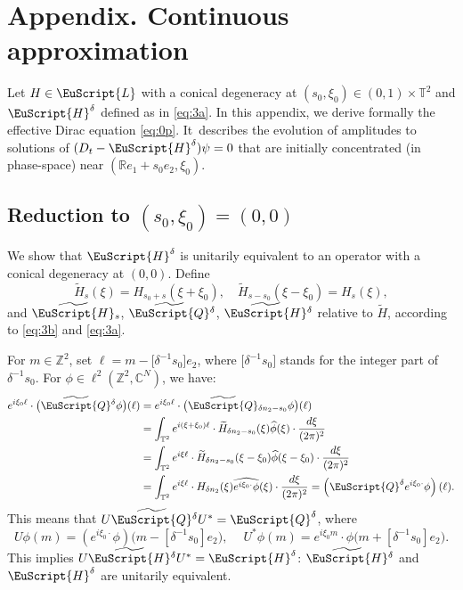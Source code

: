 \documentclass[JEP,XML,SOM,Unicode,NoFloatCountersInSection]{cedram}
\let\pazocal\EuScript
\theoremstyle{definition}
\newcommand{\QQ}{{\pazocal{Q}}}
\newcommand{\LL}{{\pazocal{L}}}
\newcommand{\HH}{\pazocal{H}}
\newcommand{\tHH}{\widetilde{\HH}{}}
\newcommand{\tQQ}{\widetilde{\QQ}{}}
\newcommand{\C}{\mathbb{C}}
\newcommand{\R}{\mathbb{R}}
\newcommand{\Z}{\mathbb{Z}}
\newcommand{\Tt}{{\mathbb{T}}}
\newcommand{\tH}{{\widetilde{H}}}
\newcommand{\hphi}{{\widehat{\phi}}}
\begin{document}
\appendix
{}
\section*{Appendix. Continuous approximation}
Let $H \in \LL$ with a conical degeneracy at $(s_0, \xi_0) \in (0,1) \times \Tt^2$ and $\HH^\delta$ defined as in \eqref{eq:3a}. In this appendix, we derive formally the effective Dirac equation \eqref{eq:0p}. It~describes the evolution of amplitudes to solutions of $(D_t-\HH^\delta) \psi = 0$ that are initially concentrated (in phase-space) near $(\R e_1+s_0e_2,\xi_0)$.

\subsection{Reduction to $(s_0, \xi_0) = (0,0)$}\label{sec:6.1} We show that $\HH^\delta$ is unitarily equivalent to an operator with a conical degeneracy at $(0,0)$. Define
\begin{equation}\label{eq:3f}
\tH_s(\xi) = H_{s_0+s}(\xi+\xi_0), \quad \tH_{s-s_0}(\xi-\xi_0) = H_s(\xi),
\end{equation}
and $\tHH_s$, $\tQQ^\delta$, $\tHH^\delta$ relative to $\tH$, according to \eqref{eq:3b} and \eqref{eq:3a}.

For $m \in \Z^2$, set $\ell = m - \bigl[\delta^{-1} s_0\bigr] e_2$, where $\bigl[\delta^{-1} s_0\bigr]$ stands for the integer part of $\delta^{-1} s_0$.
For $\phi \in \ell^2(\Z^2,\C^N)$, we have:
\[
\begin{split}
e^{i\xi_0 \ell } \cdot \bigl( \tQQ^\delta \phi \bigr)(\ell)
&= e^{i\xi_0 \ell } \cdot \bigl( \tQQ_{\delta n_2-s_0} \phi \bigr)(\ell)
\\
&= \int_{\Tt^2} e^{i(\xi+\xi_0) \ell} \cdot \tH_{\delta n_2-s_0}(\xi) \hphi(\xi) \cdot \dfrac{d\xi}{(2\pi)^2}\\
&= \int_{\Tt^2} e^{i\xi \ell} \cdot \tH_{\delta n_2-s_0}(\xi-\xi_0) \hphi(\xi-\xi_0) \cdot \dfrac{d\xi}{(2\pi)^2}
\\
&= \int_{\Tt^2} e^{i\xi \ell} \cdot H_{\delta n_2}(\xi) \widehat{e^{i\xi_0 \cdot}\phi}(\xi) \cdot \dfrac{d\xi}{(2\pi)^2} = \left(\QQ^\delta e^{i\xi_0 \cdot} \phi\right) (\ell).
\end{split}
\]
This means that $U \tQQ^\delta U^* = \QQ^\delta$, where
\begin{equation*}
U \phi(m) = \left(e^{i\xi_0 \cdot} \phi\right)\bigl( m - [\delta^{-1}s_0] e_2\bigr), \quad \ U^* \phi(m) = e^{i\xi_0 m} \cdot \phi\bigl( m + [\delta^{-1}s_0] e_2 \bigr).
\end{equation*}
This implies $U \tHH^\delta U^* = \HH^\delta$: $\tHH^\delta$ and $\HH^\delta$ are unitarily equivalent.
\end{document}

